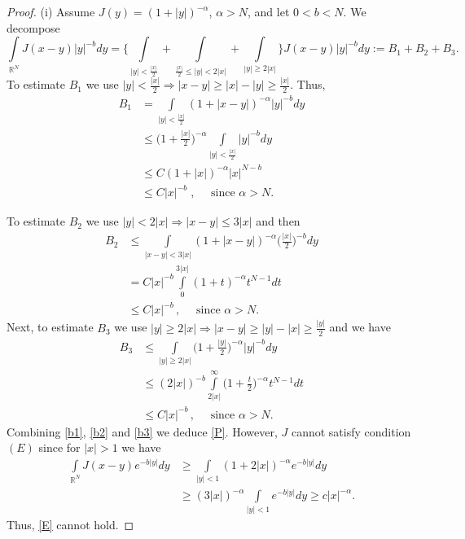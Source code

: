 \documentclass[10pt,a4paper]{amsart}
\newcommand{\R}{\mathbb R}
\newcommand{\intl}{\int\limits}
\begin{document}
\begin{proof}
(i) Assume $J(y)=(1+|y|)^{-\alpha}$, $\alpha>N$, and let $0<b<N$. We decompose
$$
\intl_{\R^N}J(x-y)|y|^{-b}dy=\Big\{\intl_{|y|<\frac{|x|}{2} }+\intl_{\frac{|x|}{2}\leq |y|<2|x| } + \intl_{|y|\geq 2|x|}  \Big\} J(x-y)|y|^{-b}dy := B_1+B_2+B_3.
$$
To estimate $B_1$ we use 
$
|y|<\frac{|x|}{2}\Longrightarrow |x-y|\geq |x|-|y|\geq \frac{|x|}{2}$.
Thus,
\begin{equation}\label{b1}
\begin{aligned}
B_1&=\intl_{|y|<\frac{|x|}{2} } (1+|x-y|)^{-\alpha} |y|^{-b}dy\\
&\leq \Big(1+\frac{|x|}{2}\Big)^{-\alpha} \intl_{|y|<\frac{|x|}{2} }  |y|^{-b}dy\\
&\leq C(1+|x|)^{-\alpha}|x|^{N-b}\\
&\leq C|x|^{-b}\; , \quad \mbox{ since }\alpha>N.
\end{aligned}
\end{equation}

To estimate $B_2$ we use 
$|y|<2|x| \Longrightarrow |x-y|\leq 3|x|$ and then 
\begin{equation}\label{b2}
\begin{aligned}
B_2&\leq \intl_{|x-y|<3 |x|} (1+|x-y|)^{-\alpha} \Big(\frac{|x|}{2}\Big)^{-b}dy\\
&=C |x|^{-b} \intl_0^{3|x|} (1+t)^{-\alpha} t^{N-1}dt\\
&\leq C |x|^{-b}\, , \quad \mbox{ since $\alpha>N$}.
\end{aligned}
\end{equation}
Next, to estimate $B_3$ we use 
$|y|\geq 2|x| \Longrightarrow |x-y|\geq |y|-|x|\geq \frac{|y|}{2}$ and we have
\begin{equation}\label{b3}
\begin{aligned}
B_3&\leq \intl_{|y|\geq 2 |x|} \Big(1+\frac{|y|}{2}\Big)^{-\alpha} |y|^{-b } dy\\
&\leq (2|x|)^{-b}  \intl_{2|x| }^\infty  \Big(1+\frac{t}{2}\Big)^{-\alpha} t^{N-1}dt\\
&\leq C |x|^{-b}\, , \quad \mbox{ since $\alpha>N$}.
\end{aligned}
\end{equation}
Combining \eqref{b1}, \eqref{b2} and \eqref{b3} we deduce \eqref{P}.
However, $J$ cannot satisfy condition $(E)$ since for $|x|>1$ we have
$$
\begin{aligned}
\intl_{\R^N}J(x-y)e^{-b|y|}dy & \geq \intl_{|y|<1}(1+2|x|)^{-\alpha} e^{-b|y|}dy\\
&\geq (3|x|)^{-\alpha} \intl_{|y|<1}  e^{-b|y|}dy \geq c|x|^{-\alpha}.
\end{aligned}
$$
Thus, \eqref{E} cannot hold.


\end{proof}
\end{document}
